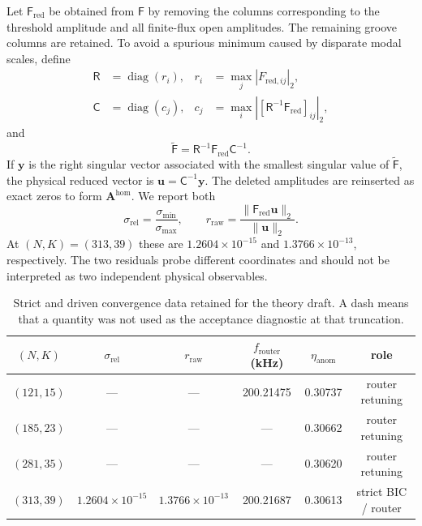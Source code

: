 \documentclass[aps,prl,reprint,superscriptaddress,nofootinbib,floatfix]{revtex4-2}
\newcommand{\vect}[1]{\bm{#1}}
\providecommand{\hom}{\mathrm{hom}}
\begin{document}
Let $\mathsf F_{\mathrm{red}}$ be obtained from $\mathsf F$ by removing the
columns corresponding to the threshold amplitude and all finite-flux open
amplitudes.  The remaining groove columns are retained.  To avoid a spurious
minimum caused by disparate modal scales, define
\begin{equation}
\begin{aligned}
 \mathsf R&=\operatorname{diag}(r_i),&
 r_i&=\max_j|F_{\mathrm{red},ij}|_2,\\
 \mathsf C&=\operatorname{diag}(c_j),&
 c_j&=\max_i|[\mathsf R^{-1}\mathsf F_{\mathrm{red}}]_{ij}|_2,
\end{aligned}
 \label{eq:s-scaling}
\end{equation}
and
\begin{equation}
 \widetilde{\mathsf F}=\mathsf R^{-1}\mathsf F_{\mathrm{red}}\mathsf C^{-1}.
 \label{eq:s-scaled}
\end{equation}
If $\vect y$ is the right singular vector associated with the smallest
singular value of $\widetilde{\mathsf F}$, the physical reduced vector is
$\vect u=\mathsf C^{-1}\vect y$.  The deleted amplitudes are reinserted as
exact zeros to form $\vect A^{\hom}$.  We report both
\begin{equation}
 \sigma_{\mathrm{rel}}=\frac{\sigma_{\min}}{\sigma_{\max}},
 \qquad
 r_{\mathrm{raw}}=\frac{\|\mathsf F_{\mathrm{red}}\vect u\|_2}{\|\vect u\|_2} .
 \label{eq:s-residuals}
\end{equation}
At $(N,K)=(313,39)$ these are $1.2604\times10^{-15}$ and
$1.3766\times10^{-13}$, respectively.  The two residuals probe different
coordinates and should not be interpreted as two independent physical
observables.

\begin{table}[t]
\caption{\label{tab:s-strict-convergence}Strict and driven convergence data retained for the theory draft.  A dash means that a quantity was not used as the acceptance diagnostic at that truncation.}
\begin{ruledtabular}
\begin{tabular}{cccccc}
$(N,K)$ & $\sigma_{\mathrm{rel}}$ & $r_{\mathrm{raw}}$ & $f_{\mathrm{router}}$ (kHz) & $\eta_{\mathrm{anom}}$ & role\\
\hline
$(121,15)$ & --- & --- & 200.21475 & 0.30737 & router retuning\\
$(185,23)$ & --- & --- & --- & 0.30662 & router retuning\\
$(281,35)$ & --- & --- & --- & 0.30620 & router retuning\\
$(313,39)$ & $1.2604\times10^{-15}$ & $1.3766\times10^{-13}$ & 200.21687 & 0.30613 & strict BIC / router\\
\end{tabular}
\end{ruledtabular}
\end{table}
\end{document}
